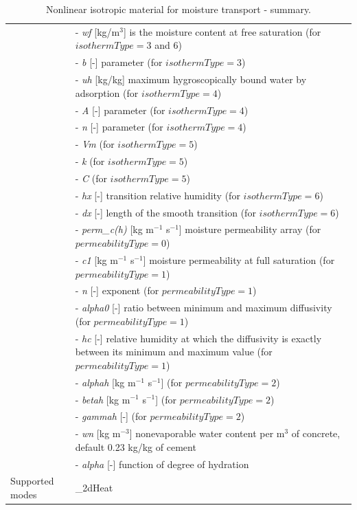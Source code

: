 \documentclass[a4paper]{article}
\newcommand{\param}[1]{{\it #1}}
\newenvironment{mmt}{\begin{tabular}{|l|p{9cm}|}}{\end{tabular}\\}
\newenvironment{mmt}{\begin{tabular}{|l|l|}}{\end{tabular}\\}
\begin{document}
\begin{table}[!htb]
\begin{mmt}
&- \param{wf} [kg/m$^3$] is the moisture content at free saturation
(for $isothermType=3$ and 6) \\
&- \param{b} [-] parameter (for $isothermType=3$) \\
&- \param{uh} [kg/kg] maximum hygroscopically
bound water by adsorption (for $isothermType=4$) \\
&- \param{A} [-] parameter (for $isothermType=4$) \\
&- \param{n} [-] parameter (for $isothermType=4$) \\
&- \param{Vm} (for $isothermType=5$) \\
&- \param{k} (for $isothermType=5$) \\
&- \param{C} (for $isothermType=5$) \\
&- \param{hx} [-] transition relative humidity (for $isothermType=6$) \\
&- \param{dx} [-] length of the smooth transition (for $isothermType=6$) \\
&- \param{perm\_c(h)} [kg m$^{-1}$ s$^{-1}$] moisture permeability
array (for $permeabilityType=0$) \\
&- \param{c1} [kg m$^{-1}$ s$^{-1}$] moisture permeability at full
saturation (for $permeabilityType=1$) \\
&- \param{n} [-] exponent (for $permeabilityType=1$) \\
&- \param{alpha0} [-] ratio between minimum and maximum diffusivity
(for $permeabilityType=1$) \\
&- \param{hc} [-] relative humidity at which the diffusivity is exactly
between its minimum and maximum value (for $permeabilityType=1$) \\
&- \param{alphah} [kg m$^{-1}$ s$^{-1}$] (for $permeabilityType=2$) \\
&- \param{betah} [kg m$^{-1}$ s$^{-1}$] (for $permeabilityType=2$) \\
&- \param{gammah} [-] (for $permeabilityType=2$) \\
&- \param{wn} [kg m$^{-3}$] nonevaporable water content per m$^3$ of concrete, default 0.23 kg/kg of cement\\
&- \param{alpha} [-] function of degree of hydration \\

Supported modes& \_2dHeat \\
\hline
\end{mmt}
\caption{Nonlinear isotropic material for moisture transport - summary.}
\label{NlIsoMoistureMat}
\end{table}
\end{document}
